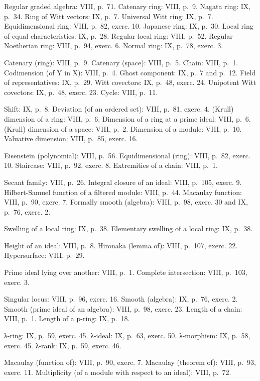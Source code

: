 
Regular graded algebra: VIII, p.~71. Catenary ring: VIII, p.~9. Nagata ring: IX, p.~34. Ring of Witt vectors: IX, p.~7. Universal Witt ring: IX, p.~7. Equidimensional ring: VIII, p.~82, exerc. 10. Japanese ring: IX, p.~30. Local ring of equal characteristics: IX, p.~28. Regular local ring: VIII, p.~52. Regular Noetherian ring: VIII, p.~94, exerc. 6. Normal ring: IX, p.~78, exerc. 3.

Catenary (ring): VIII, p.~9. Catenary (space): VIII, p.~5. Chain: VIII, p.~1. Codimension (of Y in X): VIII, p.~4. Ghost component: IX, p.~7 and p.~12. Field of representatives: IX, p.~29. Witt covectors: IX, p.~48, exerc. 24. Unipotent Witt covectors: IX, p.~48, exerc. 23. Cycle: VIII, p.~11.

Shift: IX, p.~8. Deviation (of an ordered set): VIII, p.~81, exerc. 4. (Krull) dimension of a ring: VIII, p.~6. Dimension of a ring at a prime ideal: VIII, p.~6. (Krull) dimension of a space: VIII, p.~2. Dimension of a module: VIII, p.~10. Valuative dimension: VIII, p.~85, exerc. 16.

Eisenstein (polynomial): VIII, p.~56. Equidimensional (ring): VIII, p.~82, exerc. 10. Staircase: VIII, p.~92, exerc. 8. Extremities of a chain: VIII, p.~1.

Secant family: VIII, p.~26. Integral closure of an ideal: VIII, p.~105, exerc. 9. Hilbert-Samuel function of a filtered module: VIII, p.~44. Macaulay function: VIII, p.~90, exerc. 7. Formally smooth (algebra): VIII, p.~98, exerc. 30 and IX, p.~76, exerc. 2.

Swelling of a local ring: IX, p.~38. Elementary swelling of a local ring: IX, p.~38.

Height of an ideal: VIII, p.~8. Hironaka (lemma of): VIII, p.~107, exerc. 22. Hypersurface: VIII, p.~29.

Prime ideal lying over another: VIII, p.~1. Complete intersection: VIII, p.~103, exerc. 3.

Singular locus: VIII, p.~96, exerc. 16. Smooth (algebra): IX, p.~76, exerc. 2. Smooth (prime ideal of an algebra): VIII, p.~98, exerc. 23. Length of a chain: VIII, p.~1. Length of a p-ring: IX, p.~18.

λ-ring: IX, p.~59, exerc. 45. λ-ideal: IX, p.~63, exerc. 50. λ-morphism: IX, p.~58, exerc. 45. λ-rank: IX, p.~59, exerc. 46.

Macaulay (function of): VIII, p.~90, exerc. 7. Macaulay (theorem of): VIII, p.~93, exerc. 11. Multiplicity (of a module with respect to an ideal): VIII, p.~72.

